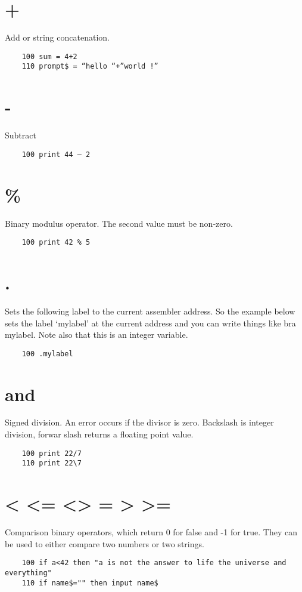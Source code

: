\section*{+}
Add or string concatenation.
\example{}
\begin{verbatim}
	100 sum = 4+2
	110 prompt$ = “hello “+”world !”
\end{verbatim}

\section*{-}
Subtract
\example{}
\begin{verbatim}
	100 print 44 – 2
\end{verbatim}

\section*{\%}
Binary modulus operator. The second value must be non-zero.
\example{}
\begin{verbatim}
	100 print 42 % 5
\end{verbatim}

\section*{.}
Sets the following label to the current assembler address. So the example below sets the label ‘mylabel’ at the current address and you can write things like bra mylabel. Note also that this is an integer variable.
\example{}
\begin{verbatim}
	100 .mylabel
\end{verbatim}

\section*{\/ and \\}
Signed division. An error occurs if the divisor is zero. Backslash is integer division, forwar slash returns a floating point value.
\example{}
\begin{verbatim}
	100 print 22/7
	110 print 22\7
\end{verbatim}

\section*{< <= <> = > >=}
Comparison binary operators, which return 0 for false and -1 for true. They can be used to either compare two numbers or two strings.
\example{}
\begin{verbatim}
	100 if a<42 then "a is not the answer to life the universe and everything"
	110 if name$="" then input name$
\end{verbatim}

